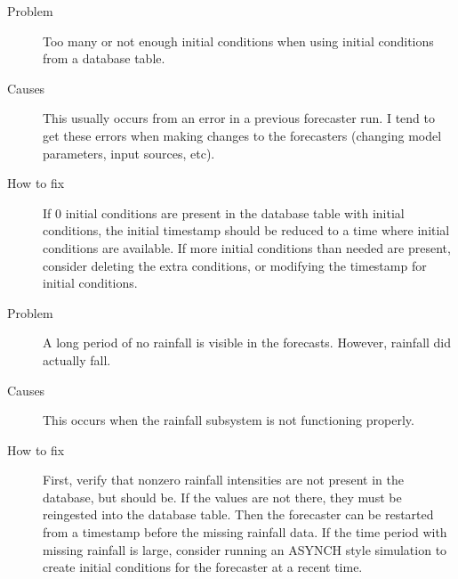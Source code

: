 \documentclass[12pt]{article}
\begin{document}
\vspace{.1in}
\begin{description}
 \item[Problem] Too many or not enough initial conditions when using initial conditions from a database table.
 \item[Causes] This usually occurs from an error in a previous forecaster run. I tend to get these errors when making changes to the forecasters (changing model parameters, input sources, etc).
 \item[How to fix] If 0 initial conditions are present in the database table with initial conditions, the initial timestamp should be reduced to a time where initial conditions are available. If more initial conditions than needed are present, consider deleting the extra conditions, or modifying the timestamp for initial conditions.
\end{description}

\vspace{.1in}
\begin{description}
 \item[Problem] A long period of no rainfall is visible in the forecasts. However, rainfall did actually fall.
 \item[Causes] This occurs when the rainfall subsystem is not functioning properly.
 \item[How to fix] First, verify that nonzero rainfall intensities are not present in the database, but should be. If the values are not there, they must be reingested into the database table. Then the forecaster can be restarted from a timestamp before the missing rainfall data. If the time period with missing rainfall is large, consider running an ASYNCH style simulation to create initial conditions for the forecaster at a recent time.
\end{description}
\end{document}
